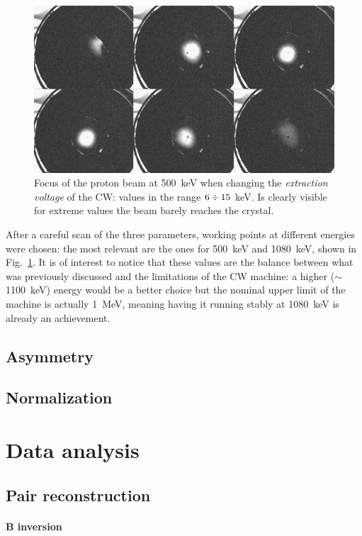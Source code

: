 \begin{refsection}
\begin{figure}
    \centering
    \includegraphics[width = \textwidth]{Figures/MEG/X17/beamtuning/focus_500keV.png}
    \caption{Focus of the proton beam at \SI{500}{keV} when changing the \textit{extraction voltage} of the CW: values in the range $6\divisionsymbol15$ keV. Is clearly visible for extreme values the beam barely reaches the crystal.}
    \label{fig:ocus_500keV}
\end{figure}


\noindent
After a careful scan of the three parameters, working points at different energies were chosen: the most relevant are the ones for \SI{500}{keV} and \SI{1080}{keV}, shown in Fig.~\ref{fig:ocus_500keV}.
It is of interest to notice that these values are the balance between what was previously discussed and the limitations of the CW machine: a higher ($\sim$\SI{1100}{keV}) energy would be a better choice but the nominal upper limit of the machine is actually \SI{1}{MeV}, meaning having it running stably at \SI{1080}{keV} is already an achievement.

\subsection{Asymmetry}
\subsection{Normalization}
\section{Data analysis}
\subsection{Pair reconstruction}
\paragraph{\textbf{B} inversion}

\end{refsection}
